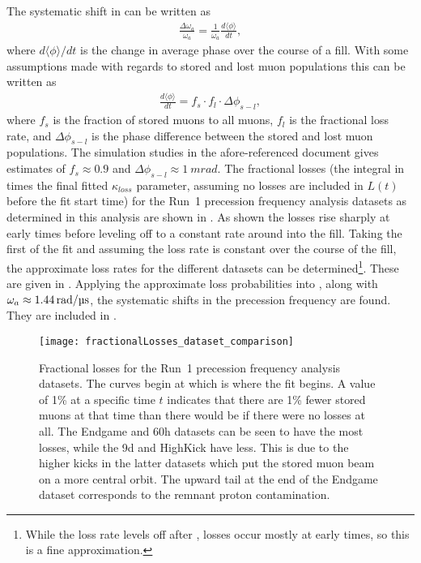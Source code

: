 The systematic shift in \wa can be written as
    \begin{align}
        \frac{\Delta\omega_{a}}{\omega_{a}} = \frac{1}{\omega_{a}}\frac{d\langle\phi\rangle}{dt},
    \end{align}
where $d\langle\phi\rangle/dt$ is the change in average phase over the course of a fill. With some assumptions made with regards to stored and lost muon populations this can be written as \cite{MikeLosses}
    \begin{align} \label{eq:phaseChangeLostMuons}
        \frac{d\langle\phi\rangle}{dt} = f_{s} \cdot f_{l} \cdot \Delta\phi_{s-l},
    \end{align}
where $f_{s}$ is the fraction of stored muons to all muons, $f_{l}$ is the fractional loss rate, and $\Delta\phi_{s-l}$ is the phase difference between the stored and lost muon populations. The simulation studies in the afore-referenced document gives estimates of $f_{s} \approx 0.9$ and $\Delta\phi_{s-l} \approx \SI{1}{mrad}$. The fractional losses (the integral in  times the final fitted $\kappa_{loss}$ parameter, assuming no losses are included in $L(t)$ before the fit start time) for the Run~1 precession frequency analysis datasets as determined in this analysis are shown in . As shown the losses rise sharply at early times before leveling off to a constant rate around  into the fill. Taking the first  of the fit and assuming the loss rate is constant over the course of the fill, the approximate loss rates for the different datasets can be determined\footnote{While the loss rate levels off after , losses occur mostly at early times, so this is a fine approximation.}. These are given in . Applying the approximate loss probabilities into , along with $\omega_{a} \approx \SI{1.44}{rad/\SI{}{\micro s}}$, the systematic shifts in the precession frequency are found. They are included in .



\begin{figure}
    \centering
    \texttt{[image: fractionalLosses\_dataset\_comparison]}
    \caption[Fractional muon losses in the analyzed Run~1 datasets]{Fractional losses for the Run~1 precession frequency analysis datasets. The curves begin at  which is where the fit begins. A value of 1\% at a specific time $t$ indicates that there are 1\% fewer stored muons at that time than there would be if there were no losses at all. The Endgame and 60h datasets can be seen to have the most losses, while the 9d and HighKick have less. This is due to the higher kicks in the latter datasets which put the stored muon beam on a more central orbit. The upward tail at the end of the Endgame dataset corresponds to the remnant proton contamination.}
    \label{fig:fractionallosses}
\end{figure}



